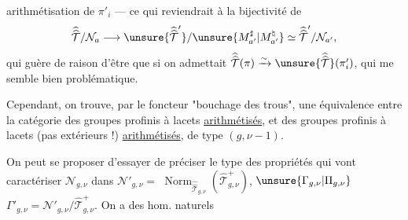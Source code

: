 
arithmétisation de $\pi'_i$ --- ce qui
reviendrait à la bijectivité de
\[
\widehat{\widehat{\mathcal T}}/\mathcal N_a
\longrightarrow
\unsure{\widehat{\widehat{\mathcal T}}'}/\unsure{M_{a'}^{\sharp}|M_{a'}^{\natural}}
\simeq \widehat{\widehat{\mathcal T}}'/\mathcal N_{a'},
\]
qui  guère de raison d'être que si
on admettait
$\widehat{\widehat{\mathcal T}}(\pi)\xrightarrow{\sim}\unsure{\widehat{\widehat{\mathcal T}}}(\pi'_i)$,
qui me semble bien problématique.

Cependant, on trouve, par le foncteur
"bouchage des trous", une équivalence
entre la catégorie des 
groupes profinis à lacets  \uline{arithmétisés},
et des groupes profinis à lacets
(pas extérieurs !) \uline{arithmétisés}, de type
$(g,\nu-1)$.

On peut se proposer d'essayer de
préciser  le type des propriétés
qui vont caractériser $\mathcal N_{g,\nu}$ dans $\mathcal N'_{g,\nu}=$
$\operatorname{Norm}_{\widehat{\widehat{\mathcal T}}_{g,\nu}}
(\widehat{\mathcal T}_{g,\nu}^{+})$,
$\unsure{\Gamma_{g,\nu}|\Pi_{g,\nu}}$
 $\Gamma'_{g,\nu}=\mathcal N'_{g,\nu}/\widehat{\mathcal T}_{g,\nu}^{+}$.
On a des hom. naturels



